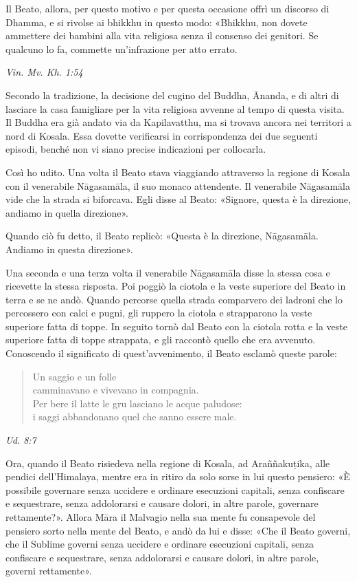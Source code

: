 Il Beato, allora, per questo motivo e per questa occasione offrì un
discorso di Dhamma, e si rivolse ai bhikkhu in questo modo: «Bhikkhu,
non dovete ammettere dei bambini alla vita religiosa senza il consenso
dei genitori. Se qualcuno lo fa, commette un’infrazione per atto errato.


\emph{Vin. Mv. Kh. 1:54}


 Secondo la tradizione, la decisione del cugino del
Buddha, Ānanda, e di altri di lasciare la casa famigliare per la vita
religiosa avvenne al tempo di questa visita. Il Buddha era già andato
via da Kapilavatthu, ma si trovava ancora nei territori a nord di
Kosala. Essa dovette verificarsi in corrispondenza dei due seguenti
episodi, benché non vi siano precise indicazioni per collocarla.


 Così ho udito. Una volta il Beato stava viaggiando
attraverso la regione di Kosala con il venerabile Nāgasamāla, il suo
monaco attendente. Il venerabile Nāgasamāla vide che la strada si
biforcava. Egli disse al Beato: «Signore, questa è la direzione, andiamo
in quella direzione».


Quando ciò fu detto, il Beato replicò: «Questa è la direzione,
Nāgasamāla. Andiamo in questa direzione».


Una seconda e una terza volta il venerabile Nāgasamāla disse la stessa
cosa e ricevette la stessa risposta. Poi poggiò la ciotola e la veste
superiore del Beato in terra e se ne andò. Quando percorse quella strada
comparvero dei ladroni che lo percossero con calci e pugni, gli ruppero
la ciotola e strapparono la veste superiore fatta di toppe. In seguito
tornò dal Beato con la ciotola rotta e la veste superiore fatta di toppe
strappata, e gli raccontò quello che era avvenuto. Conoscendo il
significato di quest’avvenimento, il Beato esclamò queste parole:


\begin{quote}
Un saggio e un folle \\
camminavano e vivevano in compagnia. \\
Per bere il latte le gru lasciano le acque paludose: \\
i saggi abbandonano quel che sanno essere male.
\end{quote}

\emph{Ud. 8:7}


Ora, quando il Beato risiedeva nella regione di Kosala, ad Araññakuṭika,
alle pendici dell’Himalaya, mentre era in ritiro da solo sorse in lui
questo pensiero: «È possibile governare senza uccidere e ordinare
esecuzioni capitali, senza confiscare e sequestrare, senza addolorarsi e
causare dolori, in altre parole, governare rettamente?». Allora Māra il
Malvagio nella sua mente fu consapevole del pensiero sorto nella mente
del Beato, e andò da lui e disse: «Che il Beato governi, che il Sublime
governi senza uccidere e ordinare esecuzioni capitali, senza confiscare
e sequestrare, senza addolorarsi e causare dolori, in altre parole,
governi rettamente».


